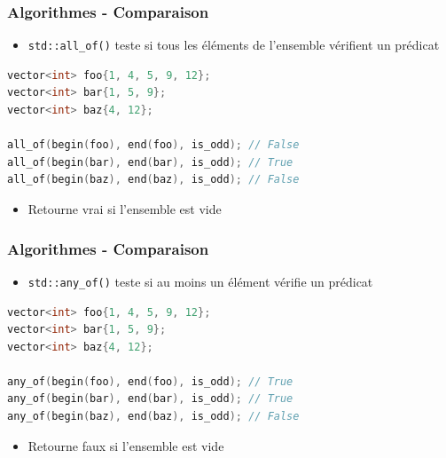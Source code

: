 \documentclass[C++.tex]{subfiles}
\begin{document}
\begin{frame}[fragile]
	\frametitle{Algorithmes - Comparaison}
	\begin{itemize}
		\item \lstinline|std::all_of()| teste si tous les éléments de l'ensemble vérifient un prédicat
	\end{itemize}

	\begin{lstlisting}[language=C++]
vector<int> foo{1, 4, 5, 9, 12};
vector<int> bar{1, 5, 9};
vector<int> baz{4, 12};

all_of(begin(foo), end(foo), is_odd); // False
all_of(begin(bar), end(bar), is_odd); // True
all_of(begin(baz), end(baz), is_odd); // False\end{lstlisting}

	\begin{itemize}
		\item Retourne vrai si l'ensemble est vide
	\end{itemize}
\end{frame}

\begin{frame}[fragile]
	\frametitle{Algorithmes - Comparaison}
	\begin{itemize}
		\item \lstinline|std::any_of()| teste si au moins un élément vérifie un prédicat
	\end{itemize}

	\begin{lstlisting}[language=C++]
vector<int> foo{1, 4, 5, 9, 12};
vector<int> bar{1, 5, 9};
vector<int> baz{4, 12};

any_of(begin(foo), end(foo), is_odd); // True
any_of(begin(bar), end(bar), is_odd); // True
any_of(begin(baz), end(baz), is_odd); // False\end{lstlisting}

	\begin{itemize}
		\item Retourne faux si l'ensemble est vide
	\end{itemize}
\end{frame}
\end{document}
